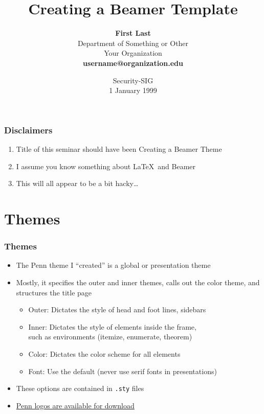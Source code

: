 \documentclass[xcolor=table]{beamer}
\title[Beamer Themes]{\textbf{Creating a Beamer Template}}
\author[F Last]{\textbf{First Last} \\ 
	{\small Department of Something or Other} \\
	{\small Your Organization} \\
	 \textbf{username@organization.edu }}
\institute[username@organization.edu]{}
\date[1 January 1999]{Security-SIG \\ 1 January 1999 }
\begin{document}
\frame[plain]{\titlepage}

\setcounter{framenumber}{0}

\begin{frame}
\tableofcontents
\end{frame}

\begin{frame}
\frametitle{Disclaimers}
\begin{enumerate}
\item<1-> Title of this seminar should have been Creating a Beamer Theme
\medskip
\item<2-> I assume you know something about \LaTeX~and Beamer
\medskip
\item<3-> This will all appear to be a bit hacky\ldots
\end{enumerate}
\end{frame}

\section{Themes}
\begin{frame}
\frametitle{Themes}
\begin{itemize}
\item The Penn theme I ``created'' is a \textcolor{quakerblue}{global} or \textcolor{quakerblue}{presentation} theme 
\smallskip
\item Mostly, it specifies the \textcolor{quakerblue}{outer} and \textcolor{quakerblue}{inner} themes, calls out the \textcolor{quakerblue}{color} theme, and structures the title page \\
\begin{itemize}
\item \textcolor{quakerblue}{Outer}: Dictates the style of head and foot lines, sidebars
\item \textcolor{quakerblue}{Inner}: Dictates the style of elements inside the frame, \\ such as environments (itemize, enumerate, theorem)
\item \textcolor{quakerblue}{Color}: Dictates the color scheme for all elements
\item \textcolor{quakerblue}{Font}: Use the default (never use serif fonts in presentations)
\end{itemize}
\smallskip
\item These options are contained in \texttt{.sty} files
\smallskip
\item \href{http://www.upenn.edu/webservices/styleguide/logo.html}{\alert{Penn logos are available for download}}
\end{itemize}
\end{frame}
\end{document}
